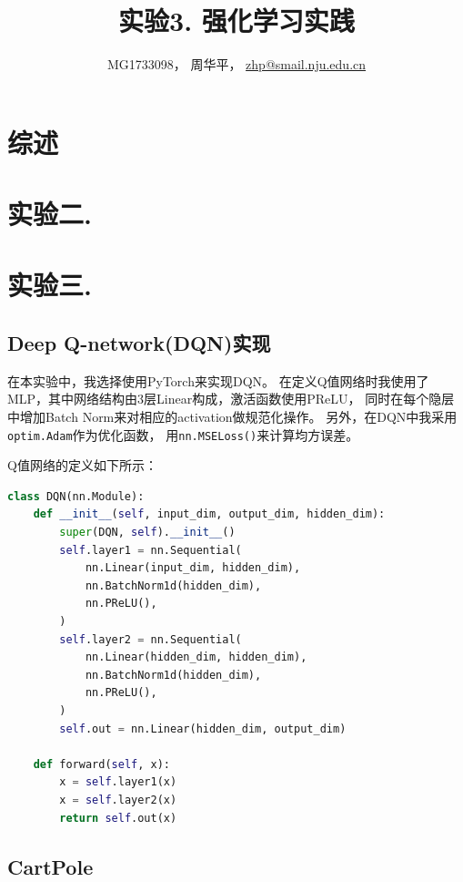 \documentclass[a4paper,UTF8]{article}
\theoremstyle{definition}
\begin{document}
\title{实验3. 强化学习实践}
\author{MG1733098， 周华平， \url{zhp@smail.nju.edu.cn}}
\maketitle

\section*{综述}



\section*{实验二.}



\section*{实验三.}


\subsection*{Deep Q-network(DQN)实现}

在本实验中，我选择使用PyTorch来实现DQN。
在定义Q值网络时我使用了MLP，其中网络结构由3层Linear构成，激活函数使用PReLU，
同时在每个隐层中增加Batch Norm来对相应的activation做规范化操作。
另外，在DQN中我采用\lstinline[language=Python]{optim.Adam}作为优化函数，
用\lstinline[language=Python]{nn.MSELoss()}来计算均方误差。

Q值网络的定义如下所示：

\begin{lstlisting}[language=Python]
class DQN(nn.Module):
    def __init__(self, input_dim, output_dim, hidden_dim):
        super(DQN, self).__init__()
        self.layer1 = nn.Sequential(
            nn.Linear(input_dim, hidden_dim),
            nn.BatchNorm1d(hidden_dim),
            nn.PReLU(),
        )
        self.layer2 = nn.Sequential(
            nn.Linear(hidden_dim, hidden_dim),
            nn.BatchNorm1d(hidden_dim),
            nn.PReLU(),
        )
        self.out = nn.Linear(hidden_dim, output_dim)

    def forward(self, x):
        x = self.layer1(x)
        x = self.layer2(x)
        return self.out(x)
\end{lstlisting}

\subsection*{CartPole}
\end{document}
